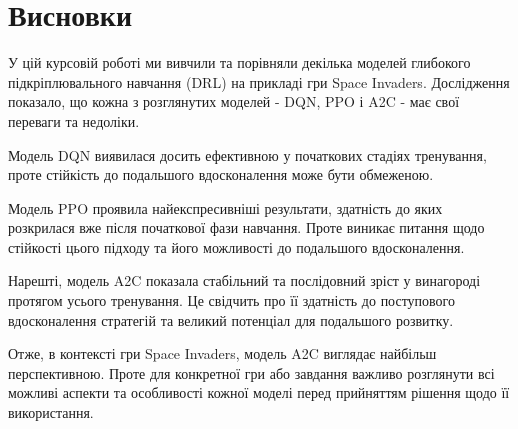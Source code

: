 
\chapter*{Висновки}
У цій курсовій роботі ми вивчили та порівняли декілька моделей глибокого підкріплювального навчання (DRL) на прикладі гри Space Invaders. Дослідження показало, що кожна з розглянутих моделей - DQN, PPO і A2C - має свої переваги та недоліки.

Модель DQN виявилася досить ефективною у початкових стадіях тренування, проте стійкість до подальшого вдосконалення може бути обмеженою.

Модель PPO проявила найекспресивніші результати, здатність до яких розкрилася вже після початкової фази навчання. Проте виникає питання щодо стійкості цього підходу та його можливості до подальшого вдосконалення.

Нарешті, модель A2C показала стабільний та послідовний зріст у винагороді протягом усього тренування. Це свідчить про її здатність до пос\-тупового вдосконалення стратегій та великий потенціал для подальшого розвитку.

Отже, в контексті гри Space Invaders, модель A2C виглядає найбільш перспективною. Проте для конкретної гри або завдання важливо розглянути всі можливі аспекти та особливості кожної моделі перед прийняттям рішення щодо її використання.